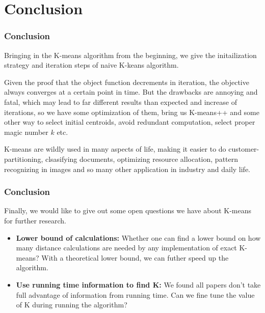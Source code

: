 \documentclass[9pt]{beamer}
\begin{document}
\section{Conclusion}
\begin{frame}
	\frametitle{Conclusion}
	Bringing in the K-means algorithm from the beginning, we give the initailization strategy and iteration steps of naive K-keans algorithm.
	\par Given the proof that the object function decrements in iteration, the objective always converges at a certain point in time. But the drawbacks are annoying and fatal, which may lead to far different results than expected and increase of iterations, so we have some optimization of them, bring us K-means++ and some other way to select initial centroids, avoid redundant computation, select proper magic number $k$ etc.
	\par K-means are wildly used in many aspects of life, making it easier to do customer-partitioning, clsasifying documents, optimizing resource allocation, pattern recognizing in images and so many other application in industry and daily life.
\end{frame}

\begin{frame}
	\frametitle{Conclusion}
	Finally, we would like to give out some open questions we have about K-means for further research.
	\begin{itemize}
	\item \textbf{Lower bound of calculations:} Whether one can find a lower bound on how many distance calculations are needed by any implementation of exact K-means? With a theoretical lower bound, we can futher speed up the algorithm.
	\item \textbf{Use running time information to find K:} We found all papers don't take full advantage of information from running time. Can we fine tune the value of K during running the algorithm?
	\end{itemize}
\end{frame}
\end{document}
